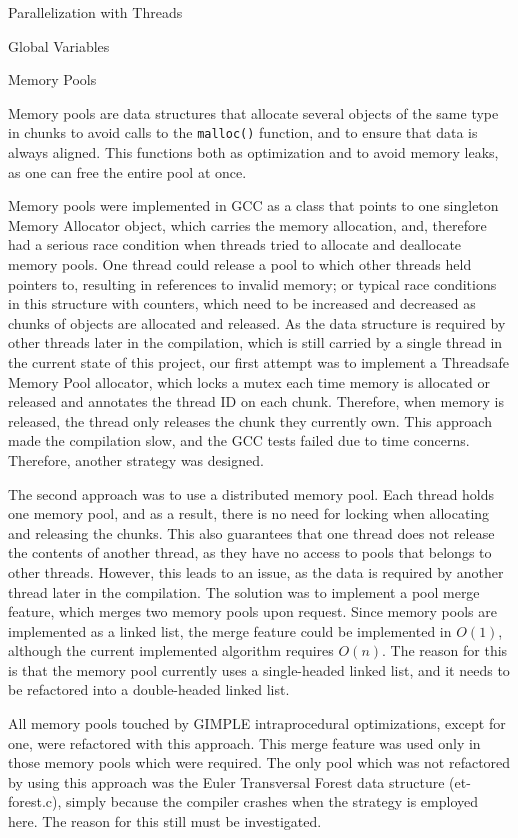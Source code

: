 \begin{section}{Parallelization with Threads}
\begin{subsection}{Global Variables}
\end{subsection}

\begin{subsection}{Memory Pools}

Memory pools are data structures that allocate several objects of the same type
in chunks to avoid calls to the \texttt{malloc()} function, and to ensure that data is
always aligned. This functions both as optimization and to avoid memory leaks, as
one can free the entire pool at once. 

Memory pools were implemented in GCC as a class that points to one
singleton Memory Allocator object, which carries the memory allocation, and,
therefore had a serious race condition when threads tried to allocate and
deallocate memory pools. One thread could release a pool to which other threads
held pointers to, resulting in references to invalid memory; or typical race
conditions in this structure with counters, which need to be increased and
decreased as chunks of objects are allocated and released. 
As the data structure is required by other threads later in the compilation,
which is still carried by a single thread in the current state of this project,
our first attempt was to implement a Threadsafe Memory Pool allocator, which
locks a mutex each time memory is allocated or released and annotates the
thread ID on each chunk. Therefore, when memory is released, the thread only
releases the chunk they currently own. This approach made the compilation slow,
and the GCC tests failed due to time concerns. Therefore, another strategy was
designed. 

The second approach was to use a distributed memory pool. Each thread holds one
memory pool, and as a result, there is no need for locking when allocating and
releasing the chunks. This also guarantees that one thread does not release the
contents of another thread, as they have no access to pools that belongs to
other threads. However, this leads to an issue, as the data is required by
another thread later in the compilation. The solution was to implement a pool
merge feature, which merges two memory pools upon request. Since memory pools
are implemented as a linked list, the merge feature could be implemented in
$O(1)$, although the current implemented algorithm requires $O(n)$. The reason for
this is that the memory pool currently uses a single-headed linked list, and it
needs to be refactored into a double-headed linked list. 

All memory pools touched by GIMPLE intraprocedural optimizations, except for one,
were refactored with this approach. This merge feature was used only in
those memory pools which were required. The only pool which was not refactored
by using this approach was the Euler Transversal Forest data structure
(et-forest.c), simply because the compiler crashes when the strategy is
employed here. The reason for this still must be investigated.


\end{subsection}
\end{section}
